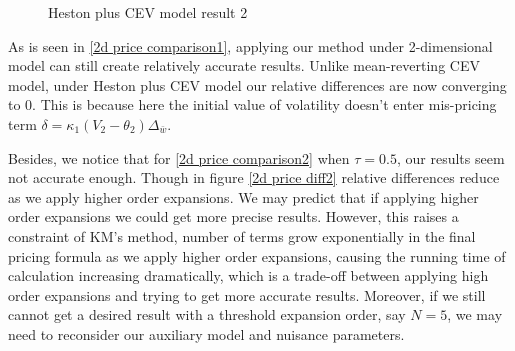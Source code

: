 \begin{figure}[ht]
  \centering
  \hfill
  \caption{Heston plus CEV model result 2}
\end{figure}

As is seen in \ref{2d price comparison1}, applying our method under 2-dimensional model can still create relatively accurate results. Unlike mean-reverting CEV model, under Heston plus CEV model our relative differences are now converging to 0. This is because here the initial value of volatility doesn't enter mis-pricing term $\delta = \kappa_1(V_2-\theta_2) \Delta_{\bar{w}}$.

Besides, we notice that for \ref{2d price comparison2} when $\tau=0.5$, our results seem not accurate enough. Though in figure \ref{2d price diff2} relative differences reduce as we apply higher order expansions. We may predict that if applying higher order expansions we could get more precise results. However, this raises a constraint of KM's method, number of terms grow exponentially in the final pricing formula as we apply higher order expansions, causing the running time of calculation increasing dramatically, which is a trade-off between applying high order expansions and trying to get more accurate results. Moreover, if we still cannot get a desired result with a threshold expansion order, say $N=5$, we may need to reconsider our auxiliary model and nuisance parameters.

